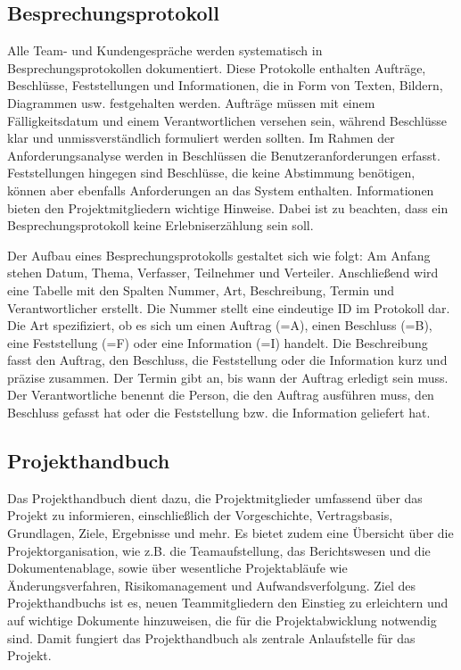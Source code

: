 \subsection{Besprechungsprotokoll}  \label{Besprechungsprotokoll}

Alle Team- und Kundengespräche werden systematisch in Besprechungsprotokollen dokumentiert. Diese Protokolle enthalten 
Aufträge, Beschlüsse, Feststellungen und Informationen, die in Form von Texten, Bildern, Diagrammen usw. festgehalten 
werden. Aufträge müssen mit einem Fälligkeitsdatum und einem Verantwortlichen versehen sein, während Beschlüsse klar 
und unmissverständlich formuliert werden sollten. Im Rahmen der Anforderungsanalyse werden in Beschlüssen die 
Benutzeranforderungen erfasst. Feststellungen hingegen sind Beschlüsse, die keine Abstimmung benötigen, können 
aber ebenfalls Anforderungen an das System enthalten. Informationen bieten den Projektmitgliedern wichtige Hinweise. 
Dabei ist zu beachten, dass ein Besprechungsprotokoll keine Erlebniserzählung sein soll.

Der Aufbau eines Besprechungsprotokolls gestaltet sich wie folgt: Am Anfang stehen Datum, Thema, Verfasser, 
Teilnehmer und Verteiler. Anschließend wird eine Tabelle mit den Spalten Nummer, Art, Beschreibung, Termin und 
Verantwortlicher erstellt. Die Nummer stellt eine eindeutige ID im Protokoll dar. Die Art spezifiziert, ob es sich 
um einen Auftrag (=A), einen Beschluss (=B), eine Feststellung (=F) oder eine Information (=I) handelt. Die 
Beschreibung fasst den Auftrag, den Beschluss, die Feststellung oder die Information kurz und präzise zusammen. Der 
Termin gibt an, bis wann der Auftrag erledigt sein muss. Der Verantwortliche benennt die Person, die den Auftrag 
ausführen muss, den Beschluss gefasst hat oder die Feststellung bzw. die Information geliefert hat.

\subsection{Projekthandbuch}  \label{Projekthandbuch}

Das Projekthandbuch dient dazu, die Projektmitglieder umfassend über das Projekt zu informieren, einschließlich der 
Vorgeschichte, Vertragsbasis, Grundlagen, Ziele, Ergebnisse und mehr. Es bietet zudem eine Übersicht über die 
Projektorganisation, wie z.B. die Teamaufstellung, das Berichtswesen und die Dokumentenablage, sowie über wesentliche 
Projektabläufe wie Änderungsverfahren, Risikomanagement und Aufwandsverfolgung. Ziel des Projekthandbuchs ist es, neuen 
Teammitgliedern den Einstieg zu erleichtern und auf wichtige Dokumente hinzuweisen, die für die Projektabwicklung 
notwendig sind. Damit fungiert das Projekthandbuch als zentrale Anlaufstelle für das Projekt.

